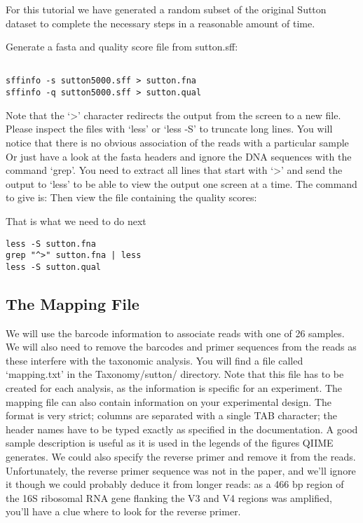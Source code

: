 \begin{information}
For this tutorial we have generated a random subset of the original Sutton dataset to complete the necessary steps in a reasonable amount of time.
\end{information}

\begin{steps}

Generate a fasta and quality score file from sutton.sff:
\begin{lstlisting}

sffinfo -s sutton5000.sff > sutton.fna
sffinfo -q sutton5000.sff > sutton.qual

\end{lstlisting}

Note that the ‘>’ character redirects the output from the screen to a new file. Please inspect the files with ‘less’ or ‘less -S’ to truncate long lines. You will notice that there is no obvious association of the reads with a particular sample
Or just have a look at the fasta headers and ignore the DNA sequences with the command ‘grep’. You need to extract all lines that start with ‘>’ and send the output to ‘less’ to be able to view the output one screen at a time. The command to give is:
Then view the file containing the quality scores:

That is what we need to do next

\begin{lstlisting}
less -S sutton.fna
grep "^>" sutton.fna | less
less -S sutton.qual

\end{lstlisting}
\end{steps}

\subsection{The Mapping File}

\begin{information}
We will use the barcode information to associate reads with one of 26 samples. We will also need to remove the barcodes and primer sequences from the reads as these interfere with the taxonomic analysis. 
You will find a file called ‘mapping.txt’ in the Taxonomy/sutton/ directory. 
Note that this file has to be created for each analysis, as the information is specific for an experiment. The mapping file can also contain information on your experimental design. The format is very strict; columns are separated with a single TAB character; the header names have to be typed exactly as specified in the documentation. A good sample description is useful as it is used in the legends of the figures QIIME generates. We could also specify the reverse primer and remove it from the reads. Unfortunately, the reverse primer sequence was not in the paper, and we’ll ignore it though we could probably deduce it from longer reads: as a 466 bp region of the 16S ribosomal RNA gene flanking the V3 and V4 regions was amplified, you’ll have a clue where to look for the reverse primer.

\end{information}

